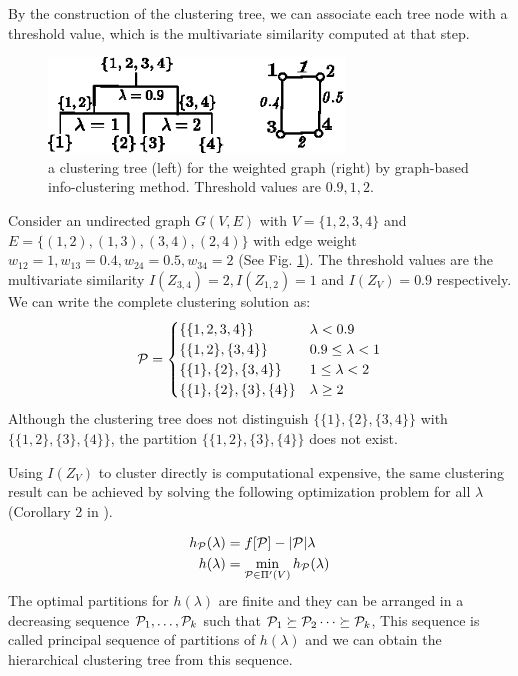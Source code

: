 \documentclass{article}
\begin{document}
By the construction of the clustering tree, we can associate each tree node with a threshold value, which is the multivariate similarity computed at that step.
\begin{example}
\begin{figure}
\centering
\includegraphics[width=0.7\textwidth]{pic/threshold.eps}
\caption{a clustering tree (left) for the weighted graph (right) by graph-based info-clustering method. Threshold values are $0.9, 1, 2$.}\label{fig:threshold}
\end{figure}
Consider an undirected graph $G(V, E)$ with $V=\{1,2,3,4\}$ and $E=\{(1,2),(1,3),(3,4),(2,4)\}$ with edge weight $w_{12}=1,w_{13}=0.4,w_{24}=0.5,w_{34}=2$ (See Fig. \ref{fig:threshold}). The threshold values are the multivariate similarity $I(Z_{3,4})=2, I(Z_{1,2})=1$ and $I(Z_V)=0.9$ respectively. We can write the complete clustering solution as:
\begin{equation*}
\P = 
\begin{cases}
\{\{1,2,3,4\}\} & \lambda < 0.9 \\
\{\{1,2\},\{3,4\}\} & 0.9 \leq \lambda < 1 \\
\{\{1\},\{2\},\{3,4\}\} & 1 \leq \lambda < 2\\
\{\{1\},\{2\},\{3\},\{4\}\} & \lambda \geq 2
\end{cases}
\end{equation*}
Although the clustering tree does not distinguish $\{\{1\},\{2\},\{3,4\}\}$ with $\{\{1,2\},\{3\}, \{4\}\}$, the partition $\{\{1,2\},\{3\}, \{4\}\}$ does not exist.
\end{example}
Using $I(Z_V)$ to cluster directly is computational expensive, the same clustering result can be achieved by solving the following optimization problem for all $\lambda$ (Corollary 2 in \cite{RN1}).
\begin{theorem}\label{thm:psp}
\begin{align}\label{eq:hL}
h_{\P}(\lambda) &=  f[\P] - \abs{\P} \lambda  \\
h(\lambda) &= \min_{\P \in \Pi'(V)} h_{\P}(\lambda)
\end{align}
The optimal partitions for $h(\lambda)$ are finite and they can be arranged in a decreasing sequence $\P_1, \dots, \P_k$ such that $\P_1 \succeq \P_2 \dots \succeq \P_k$, This sequence is called principal sequence of partitions of $h(\lambda)$ and we can obtain the hierarchical clustering tree from this sequence.
\end{theorem}
\end{document}
